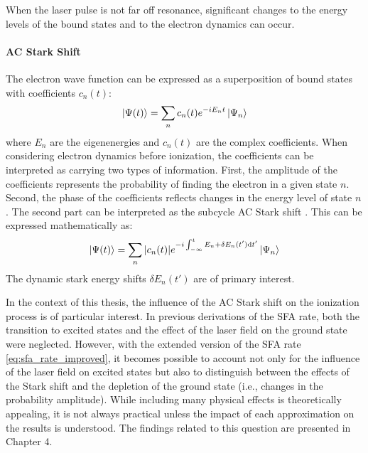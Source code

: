 When the laser pulse is not far off resonance, significant changes to the energy levels of the bound states and to the electron dynamics can occur.

\paragraph{AC Stark Shift}
The electron wave function can be expressed as a superposition of bound states with coefficients $c_n(t)$:
\begin{equation*}
    \ket{\Psi(t)} = \sum_n c_n(t) e^{-iE_nt}\ket{\Psi_n}
\end{equation*}
where $E_n$ are the eigenenergies and $c_n(t)$ are the complex coefficients.
When considering electron dynamics before ionization, the coefficients can be interpreted as carrying two types of information.
First, the amplitude of the coefficients represents the probability of finding the electron in a given state $n$.
Second, the phase of the coefficients reflects changes in the energy level of state $n$.
The second part can be interpreted as the subcycle AC Stark shift \cite{subsycleacstarkshift}.
This can be expressed mathematically as:
\begin{equation}
    \ket{\Psi(t)} = \sum_n |c_n(t)| e^{-i\int_{-\infty}^{t}E_n + \delta E_n(t')\mathrm{d} t'}\ket{\Psi_n}      \label{eq:ac_stark_shift}
\end{equation}
The dynamic stark energy shifts $\delta E_n(t')$ are of primary interest.

\bigskip
In the context of this thesis, the influence of the AC Stark shift on the ionization process is of particular interest.
In previous derivations of the SFA rate, both the transition to excited states and the effect of the laser field on the ground state were neglected.
However, with the extended version of the SFA rate \eqref{eq:sfa_rate_improved}, it becomes possible to account not only for the influence of the laser field on excited states but also to distinguish between the effects of the Stark shift and the depletion of the ground state (i.e., changes in the probability amplitude).
While including many physical effects is theoretically appealing, it is not always practical unless the impact of each approximation on the results is understood.
The findings related to this question are presented in Chapter 4.